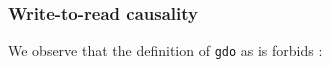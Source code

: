 \documentclass[a4paper]{article}
\begin{document}
% 
% 
% 
% 
% 
% 
% 
% 
% 
% 
% 
% 
% 

\subsubsection{Write-to-read causality}

We observe that the definition of {\tt gdo} as is forbids :
\end{document}
